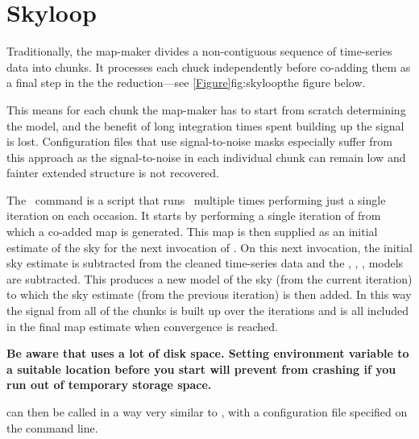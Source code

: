 \section{Skyloop}
\label{sec:skyloop}


Traditionally, the map-maker divides a non-contiguous sequence of
time-series data into chunks. It processes each chuck independently
before co-adding them as a final step in the the reduction---see
\cref{Figure}{fig:skyloop}{the figure below}.

This means for each chunk the map-maker has to start from scratch
determining the  model, and the benefit of long integration
times spent building up the signal is lost. Configuration files that use
signal-to-noise masks especially suffer from this approach as the
signal-to-noise in each individual chunk can remain low and fainter
extended structure is not recovered.

The \skyloop\ command is a script that runs \makemap\ multiple times
performing just a single iteration on each occasion. It starts by
performing a single iteration of  from which a
co-added map is generated. This map is then supplied as an initial
estimate of the sky for the next invocation of . On
this next invocation, the initial sky estimate is subtracted from the
cleaned time-series data and the , ,
,  models are subtracted. This produces a new
model of the sky (from the current iteration) to which the sky
estimate (from the previous iteration) is then added. In this way the
signal from all of the chunks is built up over the iterations and is
all included in the final map estimate when convergence is reached.




\textbf{Be aware that  uses a lot of disk space. Setting
environment variable  to a suitable location
before you start will prevent  from crashing
if you run out of temporary storage space.}
\begin{terminalv}
\end{terminalv}
 can then be called in a way very similar to \makemap, with
a configuration file specified on the command line.
\begin{terminalv}
\end{terminalv}

